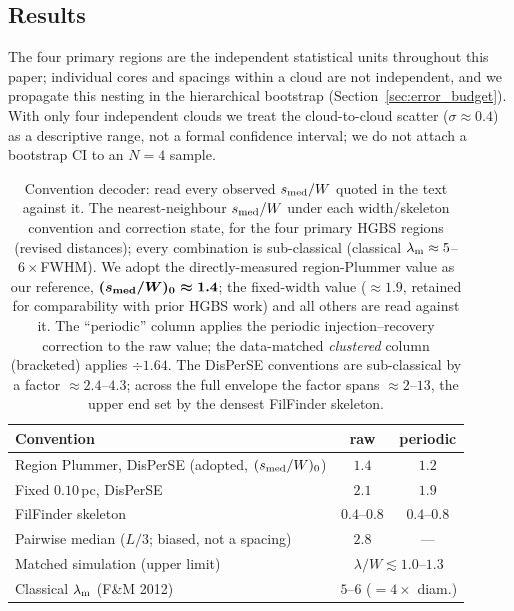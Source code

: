 \documentclass[usenatbib,twoside,twocolumn]{mnras}
\begin{document}
\subsection{Results}

The four primary regions are the independent statistical units throughout this paper; individual cores and spacings within a cloud are not independent, and we propagate this nesting in the hierarchical bootstrap (Section~\ref{sec:error_budget}). With only four independent clouds we treat the cloud-to-cloud scatter ($\sigma\approx0.4$) as a descriptive range, not a formal confidence interval; we do not attach a bootstrap CI to an $N=4$ sample.

\begin{table}
\caption{Convention decoder: read every observed $s_{\rm med}/W$ quoted in the text against it. The nearest-neighbour $s_{\rm med}/W$ under each width/skeleton convention and correction state, for the four primary HGBS regions (revised distances); every combination is sub-classical (classical $\lambda_{\rm m}\approx5$--$6\times$FWHM). We adopt the directly-measured region-Plummer value as our reference, $\boldsymbol{(s_{\rm med}/W)_0\approx1.4}$; the fixed-width value ($\approx1.9$, retained for comparability with prior HGBS work) and all others are read against it. The ``periodic'' column applies the periodic injection--recovery correction to the raw value; the data-matched \emph{clustered} column (bracketed) applies $\div1.64$. The DisPerSE conventions are sub-classical by a factor $\approx2.4$--$4.3$; across the full envelope the factor spans $\approx2$--$13$, the upper end set by the densest FilFinder skeleton.}
\label{tab:headline}
\footnotesize
\setlength{\tabcolsep}{4pt}
\begin{tabular}{p{4.2cm}cc}
\toprule
Convention & raw & periodic \\
\midrule
Region Plummer, DisPerSE (adopted, $(s_{\rm med}/W)_0$) & $\mathbf{1.4}$ & $1.2$ \\
Fixed $0.10$\,pc, DisPerSE & $2.1$ & $1.9$ \\
FilFinder skeleton & $0.4$--$0.8$ & $0.4$--$0.8$ \\
Pairwise median ($L/3$; biased, not a spacing) & $2.8$ & --- \\
\midrule
Matched simulation (upper limit) & \multicolumn{2}{c}{$\lambda/W\lesssim1.0$--$1.3$} \\
Classical $\lambda_{\rm m}$ (F\&M 2012) & \multicolumn{2}{c}{$5$--$6$ ($=4\times$ diam.)} \\
\bottomrule

\end{tabular}
\end{table}
\end{document}
